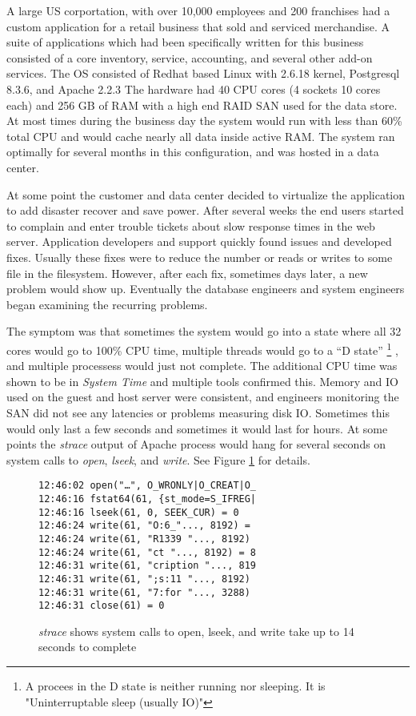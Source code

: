 A large US corportation, with over 10,000 employees and 200 franchises had a custom application for a retail business that sold and serviced merchandise.  A suite of applications which had been specifically written for this business consisted of a core inventory, service, accounting, and several other add-on services.  The OS consisted of Redhat based Linux with 2.6.18 kernel, Postgresql 8.3.6, and Apache 2.2.3 The hardware had 40 CPU cores (4 sockets 10 cores each) and 256 GB of RAM with a high end RAID SAN used for the data store.  At most times during the business day the system would run with less than 60\% total CPU and would cache nearly all data inside active RAM.   The system ran optimally for several months in this configuration, and was hosted in a data center.

\indent At some point the customer and data center decided to virtualize the application to add disaster recover and save power.  After several weeks the end users started to complain and enter trouble tickets about slow response times in the web server.  Application developers and support quickly found issues and developed fixes.   Usually these fixes were to reduce the number or reads or writes to some file in the filesystem.  However, after each fix, sometimes days later, a new problem would show up.  Eventually the database engineers and system engineers began examining the recurring problems.

\indent The symptom was that sometimes the system would go into a state where all 32 cores would go to 100\% CPU time, multiple threads would go to a “D state” \footnote{A procees in the D state is neither running nor sleeping.  It is "Uninterruptable sleep (usually IO)"} , and multiple processess would just not complete.   The additional CPU time was shown to be in \emph{System Time} and multiple tools confirmed this.  Memory and IO used on the guest and host server were consistent, and engineers monitoring the SAN did not see any latencies or problems measuring disk IO.  Sometimes this would only last a few seconds and sometimes it would last for hours. At some points the \emph{strace} output of Apache process would hang for several seconds on system calls to \emph{open}, \emph{lseek}, and \emph{write}.  See Figure \ref{fig:syscalls} for details.

\begin{figure}
\begin{Verbatim}
12:46:02 open("…", O_WRONLY|O_CREAT|O_
12:46:16 fstat64(61, {st_mode=S_IFREG| 
12:46:16 lseek(61, 0, SEEK_CUR) = 0 
12:46:24 write(61, "O:6_"..., 8192) =  
12:46:24 write(61, "R1339 "..., 8192)  
12:46:24 write(61, "ct "..., 8192) = 8 
12:46:31 write(61, "cription "..., 819  
12:46:31 write(61, ";s:11 "..., 8192)  
12:46:31 write(61, "7:for "..., 3288)  
12:46:31 close(61) = 0
\end{Verbatim}
\label{fig:syscalls}
\caption{\emph{strace} shows system calls to open, lseek, and write take up to 14 seconds to complete}
\end{figure}

